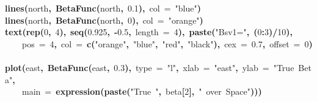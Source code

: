 \documentclass{article}
\makeatletter
\newcommand{\hlnumber}[1]{\textcolor[rgb]{0,0,0}{#1}}%
\newcommand{\hlfunctioncall}[1]{\textcolor[rgb]{0.501960784313725,0,0.329411764705882}{\textbf{#1}}}%
\newcommand{\hlstring}[1]{\textcolor[rgb]{0.6,0.6,1}{#1}}%
\newcommand{\hlkeyword}[1]{\textcolor[rgb]{0,0,0}{\textbf{#1}}}%
\newcommand{\hlargument}[1]{\textcolor[rgb]{0.690196078431373,0.250980392156863,0.0196078431372549}{#1}}%
\newcommand{\hlsymbol}[1]{\textcolor[rgb]{0,0,0}{#1}}%
\newcommand{\hlstd}[1]{\textcolor[rgb]{0,0,0}{#1}}%
\newenvironment{kframe}{%
 \def\FrameCommand##1{\hskip\@totalleftmargin \hskip-\fboxsep
 \colorbox{shadecolor}{##1}\hskip-\fboxsep
     \hskip-\linewidth \hskip-\@totalleftmargin \hskip\columnwidth}%
 \MakeFramed {\advance\hsize-\width
   \@totalleftmargin\z@ \linewidth\hsize
   \@setminipage}}%
 {\par\unskip\endMakeFramed}
\newenvironment{knitrout}{}{} %
\makeatother
\begin{document}
\begin{knitrout}
\begin{kframe}
\begin{flushleft}
\hlstd{}\hlfunctioncall{lines}\hlkeyword{(}\hlsymbol{north}\hlkeyword{,}{\ }\hlfunctioncall{BetaFunc}\hlkeyword{(}\hlsymbol{north}\hlkeyword{,}{\ }\hlnumber{0.1}\hlkeyword{)}\hlkeyword{,}{\ }\hlargument{col}{\ }\hlargument{=}{\ }\hlstring{"{}blue"{}}\hlkeyword{)}\hspace*{\fill}\\
\hlstd{}\hlfunctioncall{lines}\hlkeyword{(}\hlsymbol{north}\hlkeyword{,}{\ }\hlfunctioncall{BetaFunc}\hlkeyword{(}\hlsymbol{north}\hlkeyword{,}{\ }\hlnumber{0}\hlkeyword{)}\hlkeyword{,}{\ }\hlargument{col}{\ }\hlargument{=}{\ }\hlstring{"{}orange"{}}\hlkeyword{)}\hspace*{\fill}\\
\hlstd{}\hlfunctioncall{text}\hlkeyword{(}\hlfunctioncall{rep}\hlkeyword{(}\hlnumber{0}\hlkeyword{,}{\ }\hlnumber{4}\hlkeyword{)}\hlkeyword{,}{\ }\hlfunctioncall{seq}\hlkeyword{(}\hlnumber{0.925}\hlkeyword{,}{\ }\hlkeyword{-}\hlnumber{0.5}\hlkeyword{,}{\ }\hlargument{length}{\ }\hlargument{=}{\ }\hlnumber{4}\hlkeyword{)}\hlkeyword{,}{\ }\hlfunctioncall{paste}\hlkeyword{(}\hlstring{"{}Bsv1="{}}\hlkeyword{,}{\ }\hlkeyword{(}\hlnumber{0}\hlkeyword{:}\hlnumber{3}\hlkeyword{)}\hlkeyword{/}\hlnumber{10}\hlkeyword{)}\hlkeyword{,}\hspace*{\fill}\\
\hlstd{}{\ }{\ }{\ }{\ }\hlargument{pos}{\ }\hlargument{=}{\ }\hlnumber{4}\hlkeyword{,}{\ }\hlargument{col}{\ }\hlargument{=}{\ }\hlfunctioncall{c}\hlkeyword{(}\hlstring{"{}orange"{}}\hlkeyword{,}{\ }\hlstring{"{}blue"{}}\hlkeyword{,}{\ }\hlstring{"{}red"{}}\hlkeyword{,}{\ }\hlstring{"{}black"{}}\hlkeyword{)}\hlkeyword{,}{\ }\hlargument{cex}{\ }\hlargument{=}{\ }\hlnumber{0.7}\hlkeyword{,}{\ }\hlargument{offset}{\ }\hlargument{=}{\ }\hlnumber{0}\hlkeyword{)}\hspace*{\fill}\\
\hlstd{}\hspace*{\fill}\\
\hlstd{}\hlfunctioncall{plot}\hlkeyword{(}\hlsymbol{east}\hlkeyword{,}{\ }\hlfunctioncall{BetaFunc}\hlkeyword{(}\hlsymbol{east}\hlkeyword{,}{\ }\hlnumber{0.3}\hlkeyword{)}\hlkeyword{,}{\ }\hlargument{type}{\ }\hlargument{=}{\ }\hlstring{"{}l"{}}\hlkeyword{,}{\ }\hlargument{xlab}{\ }\hlargument{=}{\ }\hlstring{"{}east"{}}\hlkeyword{,}{\ }\hlargument{ylab}{\ }\hlargument{=}{\ }\hlstring{"{}True{\ }Beta"{}}\hlkeyword{,}\hspace*{\fill}\\
\hlstd{}{\ }{\ }{\ }{\ }\hlargument{main}{\ }\hlargument{=}{\ }\hlfunctioncall{expression}\hlkeyword{(}\hlfunctioncall{paste}\hlkeyword{(}\hlstring{"{}True{\ }"{}}\hlkeyword{,}{\ }\hlsymbol{beta}\hlkeyword{[}\hlnumber{2}\hlkeyword{]}\hlkeyword{,}{\ }\hlstring{"{}{\ }over{\ }Space"{}}\hlkeyword{)}\hlkeyword{)}\hlkeyword{)}\hspace*{\fill}\\

\end{flushleft}
\end{kframe}
\end{knitrout}
\end{document}
